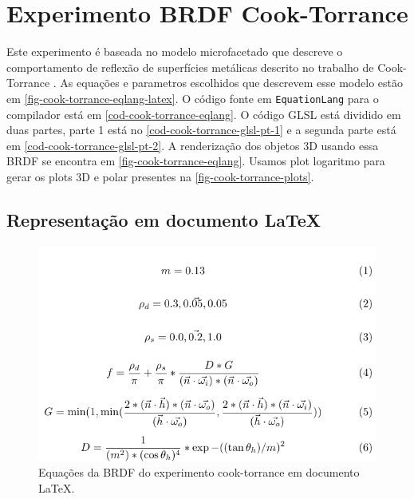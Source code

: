 \section{Experimento BRDF Cook-Torrance}\label{sec:cook-torrance}

Este experimento é baseada no modelo microfacetado que descreve o comportamento de reflexão de superfícies metálicas descrito no trabalho de Cook-Torrance \cite{cook1982reflectance}. As equações e parametros escolhidos que descrevem esse modelo estão em \autoref{fig-cook-torrance-eqlang-latex}. O código fonte em \texttt{EquationLang} para o compilador está em \autoref{cod-cook-torrance-eqlang}. O código GLSL está dividido em duas partes, parte 1 está no \autoref{cod-cook-torrance-glsl-pt-1} e a segunda parte está em \autoref{cod-cook-torrance-glsl-pt-2}. A renderização dos objetos 3D usando essa BRDF se encontra em \autoref{fig-cook-torrance-eqlang}. Usamos plot logaritmo para gerar os plots 3D e polar presentes na \autoref{fig-cook-torrance-plots}.

\subsection{Representação em documento \LaTeX{}}
\begin{figure}[H]
    \caption{\label{fig-cook-torrance-eqlang-latex} \small Equações da BRDF do experimento cook-torrance em documento \LaTeX{}.}
    \begin{center}
        \includegraphics[scale=0.92]{./Imagens/brdfs/cook-torrance.pdf}
    \end{center}
\end{figure}

